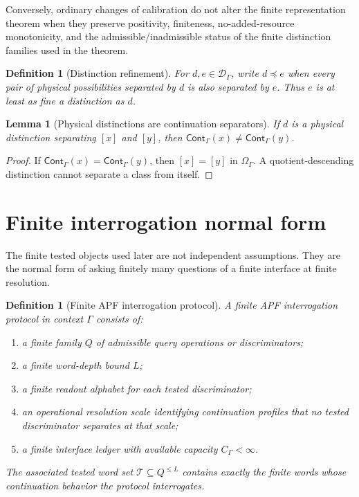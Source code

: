 \documentclass[11pt]{article}
\newtheorem{lemma}[theorem]{Lemma}
\newtheorem{definition}[theorem]{Definition}
\newcommand{\Cont}{\mathsf{Cont}}
\begin{document}
Conversely, ordinary changes of calibration do not alter the finite
representation theorem when they preserve positivity, finiteness,
no-added-resource monotonicity, and the admissible/inadmissible
status of the finite distinction families used in the theorem.

\begin{definition}[Distinction refinement]
For $d,e\in\mathcal D_\Gamma$, write $d\preceq e$ when every pair of physical possibilities separated by $d$ is also separated by $e$.  Thus $e$ is at least as fine a distinction as $d$.
\end{definition}

\begin{lemma}[Physical distinctions are continuation separators]
If $d$ is a physical distinction separating $[x]$ and $[y]$, then $\Cont_\Gamma(x)\ne\Cont_\Gamma(y)$.
\end{lemma}
\begin{proof}
If $\Cont_\Gamma(x)=\Cont_\Gamma(y)$, then $[x]=[y]$ in $\Omega_\Gamma$.  A quotient-descending distinction cannot separate a class from itself.
\end{proof}

\section{Finite interrogation normal form}\label{sec:finite-interrogation-normal-form}

The finite tested objects used later are not independent assumptions.  They are the normal form of asking finitely many questions of a finite interface at finite resolution.

\begin{definition}[Finite APF interrogation protocol]\label{def:finite-apf-interrogation}
A finite APF interrogation protocol in context $\Gamma$ consists of:
\begin{enumerate}[label=(\roman*),leftmargin=2em]
\item a finite family $Q$ of admissible query operations or discriminators;
\item a finite word-depth bound $L$;
\item a finite readout alphabet for each tested discriminator;
\item an operational resolution scale identifying continuation profiles that no tested discriminator separates at that scale;
\item a finite interface ledger with available capacity $C_\Gamma<\infty$.
\end{enumerate}
The associated tested word set $\mathcal T\subseteq Q^{\le L}$ contains exactly the finite words whose continuation behavior the protocol interrogates.
\end{definition}
\end{document}
